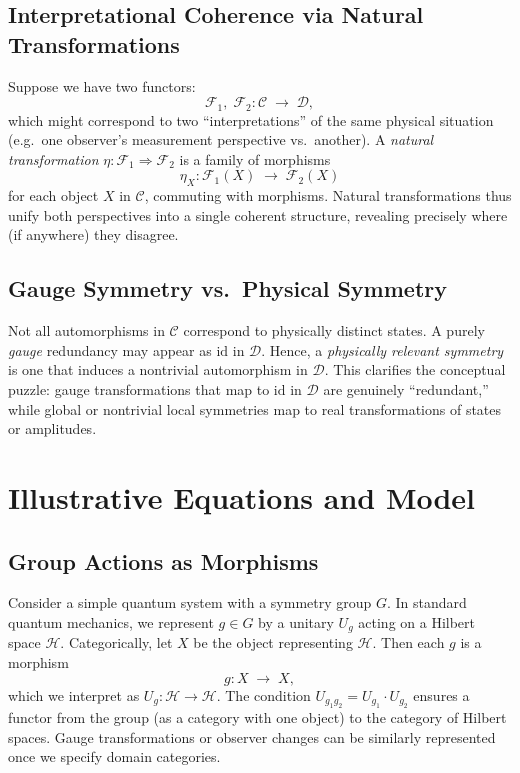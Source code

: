 \documentclass[12pt]{article}
\begin{document}
\subsection{Interpretational Coherence via Natural Transformations}
Suppose we have two functors:
\[
\mathcal{F}_1, \; \mathcal{F}_2 : \mathcal{C} \;\longrightarrow\; \mathcal{D},
\]
which might correspond to two “interpretations” of the same physical situation (e.g.\ 
one observer’s measurement perspective vs.\ another). A \emph{natural transformation} 
$\eta : \mathcal{F}_1 \Rightarrow \mathcal{F}_2$ is a family of morphisms 
\[
\eta_X : \mathcal{F}_1(X) \;\longrightarrow\; \mathcal{F}_2(X)
\]
for each object $X$ in $\mathcal{C}$, commuting with morphisms. Natural transformations 
thus unify both perspectives into a single coherent structure, revealing precisely where 
(if anywhere) they disagree.

\subsection{Gauge Symmetry vs.\ Physical Symmetry}
Not all automorphisms in $\mathcal{C}$ correspond to physically distinct states. 
A purely \emph{gauge} redundancy may appear as $\mathrm{id}$ in $\mathcal{D}$. 
Hence, a \emph{physically relevant symmetry} is one that induces a nontrivial automorphism 
in $\mathcal{D}$. This clarifies the conceptual puzzle: gauge transformations that 
map to $\mathrm{id}$ in $\mathcal{D}$ are genuinely “redundant,” while global or 
nontrivial local symmetries map to real transformations of states or amplitudes.

\section{Illustrative Equations and Model}
\label{sec:Equations}

\subsection{Group Actions as Morphisms}
Consider a simple quantum system with a symmetry group $G$. 
In standard quantum mechanics, we represent $g \in G$ by a unitary $U_g$ acting on a Hilbert space $\mathcal{H}$. 
Categorically, let $X$ be the object representing $\mathcal{H}$. Then each $g$ is a morphism
\[
g : X \;\longrightarrow\; X,
\]
which we interpret as $U_g: \mathcal{H} \to \mathcal{H}$. The condition 
$U_{g_1 g_2} = U_{g_1} \cdot U_{g_2}$ ensures a functor from the group (as a category with one object) 
to the category of Hilbert spaces. Gauge transformations or observer changes can be similarly represented 
once we specify domain categories.
\end{document}
